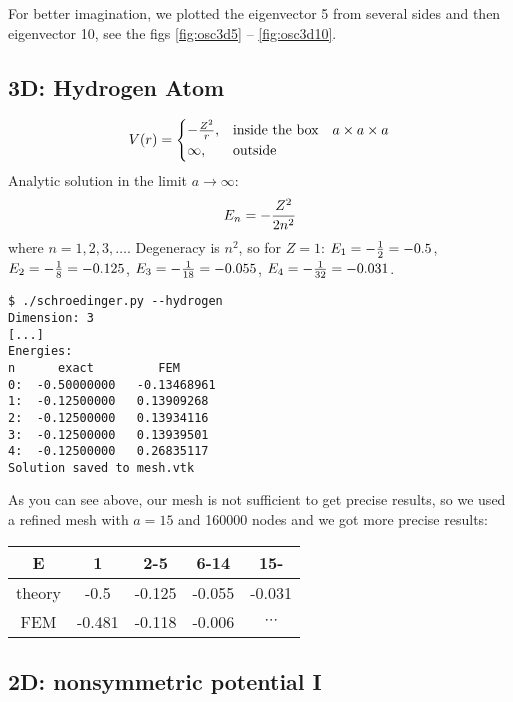 For better imagination, we plotted the eigenvector 5 from several sides and then
eigenvector 10, see the figs \ref{fig:osc3d5} -- \ref{fig:osc3d10}.





\subsection{3D: Hydrogen Atom}

$$V(r)=\begin{cases}-{Z^2\over r},&\text{inside the box}\quad a\times a\times a \\
\infty, & \text{outside}\end{cases}$$
Analytic solution in the limit $a\to\infty$:
$$E_n=-{Z^2\over2n^2}$$
where $n=1, 2, 3, \dots$.
Degeneracy is $n^2$, so for $Z=1$:
$E_1 = -{1\over2}=-0.5$,
$E_2 = -{1\over8}=-0.125$,
$E_3 = -{1\over18}=-0.055$,
$E_4 = -{1\over32}=-0.031$.

\begin{lstlisting}
$ ./schroedinger.py --hydrogen
Dimension: 3
[...]
Energies:
n      exact         FEM
0:  -0.50000000   -0.13468961
1:  -0.12500000   0.13909268
2:  -0.12500000   0.13934116
3:  -0.12500000   0.13939501
4:  -0.12500000   0.26835117
Solution saved to mesh.vtk
\end{lstlisting}

As you can see above, our mesh is not sufficient to get precise results, so we
used a refined mesh with $a=15$ and 160000 nodes and we got more precise
results:

\begin{tabular}{ c | c c c c }
E      & 1 & 2-5 & 6-14 & 15- \\
\hline
theory & -0.5 & -0.125 & -0.055 & -0.031 \\
FEM    & -0.481 & -0.118 & -0.006 & $\cdots$ \\
\end{tabular}

\subsection{2D: nonsymmetric potential I}

